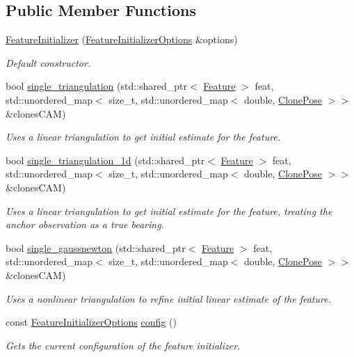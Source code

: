 \subsection*{Public Member Functions}
\begin{DoxyCompactItemize}
\item 
\hyperlink{classov__core_1_1FeatureInitializer_afa2efde962719a502507044379644e63}{Feature\+Initializer} (\hyperlink{structov__core_1_1FeatureInitializerOptions}{Feature\+Initializer\+Options} \&options)
\begin{DoxyCompactList}\small\item\em Default constructor. \end{DoxyCompactList}\item 
bool \hyperlink{classov__core_1_1FeatureInitializer_a86e8f87f677689e6588516f8d08086d7}{single\+\_\+triangulation} (std\+::shared\+\_\+ptr$<$ \hyperlink{classov__core_1_1Feature}{Feature} $>$ feat, std\+::unordered\+\_\+map$<$ size\+\_\+t, std\+::unordered\+\_\+map$<$ double, \hyperlink{structov__core_1_1FeatureInitializer_1_1ClonePose}{Clone\+Pose} $>$$>$ \&clones\+C\+AM)
\begin{DoxyCompactList}\small\item\em Uses a linear triangulation to get initial estimate for the feature. \end{DoxyCompactList}\item 
bool \hyperlink{classov__core_1_1FeatureInitializer_a97e8070e331293368ed1fedd62458d5e}{single\+\_\+triangulation\+\_\+1d} (std\+::shared\+\_\+ptr$<$ \hyperlink{classov__core_1_1Feature}{Feature} $>$ feat, std\+::unordered\+\_\+map$<$ size\+\_\+t, std\+::unordered\+\_\+map$<$ double, \hyperlink{structov__core_1_1FeatureInitializer_1_1ClonePose}{Clone\+Pose} $>$$>$ \&clones\+C\+AM)
\begin{DoxyCompactList}\small\item\em Uses a linear triangulation to get initial estimate for the feature, treating the anchor observation as a true bearing. \end{DoxyCompactList}\item 
bool \hyperlink{classov__core_1_1FeatureInitializer_a27eb3af3c4e22473e795966eff800599}{single\+\_\+gaussnewton} (std\+::shared\+\_\+ptr$<$ \hyperlink{classov__core_1_1Feature}{Feature} $>$ feat, std\+::unordered\+\_\+map$<$ size\+\_\+t, std\+::unordered\+\_\+map$<$ double, \hyperlink{structov__core_1_1FeatureInitializer_1_1ClonePose}{Clone\+Pose} $>$$>$ \&clones\+C\+AM)
\begin{DoxyCompactList}\small\item\em Uses a nonlinear triangulation to refine initial linear estimate of the feature. \end{DoxyCompactList}\item 
const \hyperlink{structov__core_1_1FeatureInitializerOptions}{Feature\+Initializer\+Options} \hyperlink{classov__core_1_1FeatureInitializer_ae12109c70cee2ce4d11c2a1b345654b8}{config} ()
\begin{DoxyCompactList}\small\item\em Gets the current configuration of the feature initializer. \end{DoxyCompactList}\end{DoxyCompactItemize}
